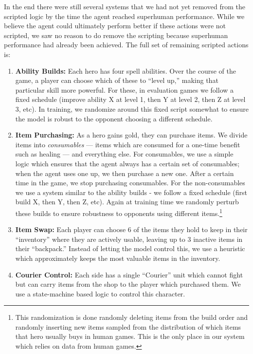 \documentclass[ocean-paper.tex]{subfiles}
\begin{document}
In the end there were still several systems that we had not yet removed from the scripted logic by the time the agent reached superhuman performance.
While we believe the agent could ultimately perform better if these actions were not scripted, we saw no reason to do remove the scripting because superhuman performance had already been achieved.
The full set of remaining scripted actions is:
\begin{enumerate}
    \item \textbf{Ability Builds:} Each hero has four spell abilities. Over the course of the game, a player can choose which of these to ``level up,'' making that particular skill more powerful. For these, in evaluation games we follow a fixed schedule (improve ability X at level 1, then Y at level 2, then Z at level 3, etc). In training, we randomize around this fixed script somewhat to ensure the model is robust to the opponent choosing a different schedule. 
    \item \textbf{Item Purchasing:} As a hero gains gold, they can purchase items. We divide items into \emph{consumables} --- items which are consumed for a one-time benefit such as healing --- and everything else. 
    For consumables, we use a simple logic which ensures that the agent always has a certain set of consumables; when the agent uses one up, we then purchase a new one. 
    After a certain time in the game, we stop purchasing consumables.
    For the non-consumables we use a system similar to the ability builds - we follow a fixed schedule (first build X, then Y, then Z, etc). 
    Again at training time we randomly perturb these builds to ensure robustness to opponents using different items.\footnote{This randomization is done randomly deleting items from the build order and randomly inserting new items sampled from the distribution of which items that hero usually buys in human games. This is the only place in our system which relies on data from human games.}
    \item \textbf{Item Swap:} Each player can choose 6 of the items they hold to keep in their ``inventory'' where they are actively usable, leaving up to 3 inactive items in their ``backpack.'' Instead of letting the model control this, we use a heuristic which approximately keeps the most valuable items in the inventory.
    \item \textbf{Courier Control:} Each side has a single ``Courier'' unit which cannot fight but can carry items from the shop to the player which purchased them. We use a state-machine based logic to control this character.
\end{enumerate}
\end{document}
